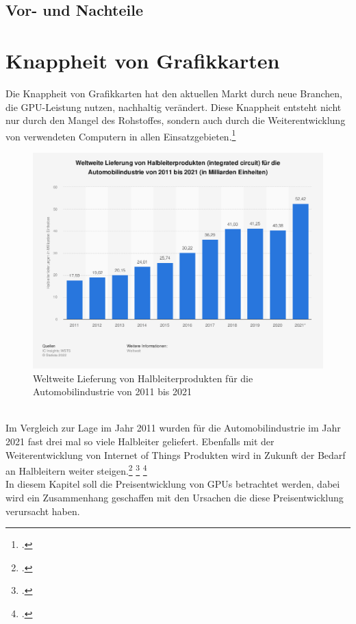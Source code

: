 \documentclass[12pt,toc=bib,toc=listof]{scrreprt}
\begin{document}
\section{Vor- und Nachteile}
\label{Vor- und Nachteile}

\chapter{Knappheit von Grafikkarten} %
\label{sec:Knappheit von Grafikkarten}

Die Knappheit von Grafikkarten hat den
aktuellen Markt durch neue Branchen, die GPU-Leistung nutzen, nachhaltig verändert.
Diese Knappheit entsteht nicht nur durch den Mangel des Rohstoffes, sondern auch durch die 
Weiterentwicklung von verwendeten Computern in allen Einsatzgebieten.\footcite [Vgl.] []{Voas.2021}
\\
\begin{figure}[h]
  \centering
  \includegraphics[scale=0.35]{Abbildungen/Martin_Kords_1.png} %
  \caption[M. Kords (2022)] {Weltweite Lieferung von Halbleiterprodukten für die Automobilindustrie von 2011 bis 2021}
\end{figure}
\\
Im Vergleich zur Lage im Jahr 2011 wurden für die Automobilindustrie im Jahr 2021 fast drei mal so viele
Halbleiter geliefert. Ebenfalls mit der Weiterentwicklung von Internet of Things Produkten wird in
Zukunft der Bedarf an Halbleitern weiter steigen.\footcite [Vgl.] []{Bill_McClean} \footcite [Vgl.] []{Voas.2021} \footcite [Vgl.] {Kords.2022}
\\In diesem Kapitel soll die Preisentwicklung von GPUs betrachtet werden, dabei wird 
ein Zusammenhang geschaffen mit den Ursachen die diese Preisentwicklung 
verursacht haben.
\\
\end{document}
